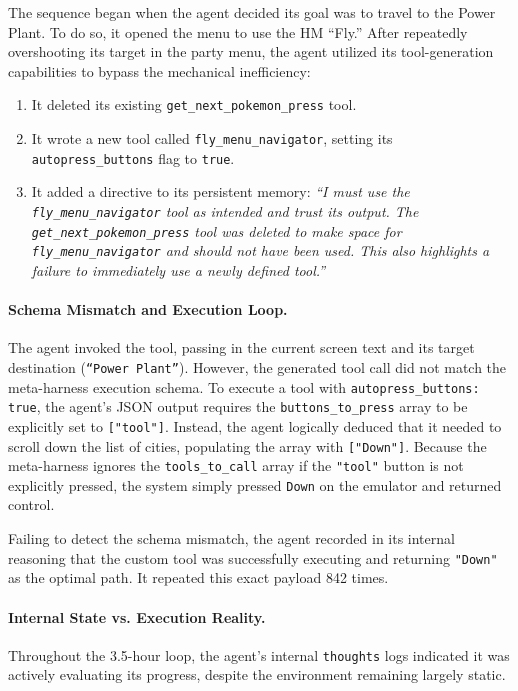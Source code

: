 The sequence began when the agent decided its goal was to travel to the Power Plant. To do so, it opened the menu to use the HM ``Fly.'' After repeatedly overshooting its target in the party menu, the agent utilized its tool-generation capabilities to bypass the mechanical inefficiency:
\begin{enumerate}
    \item It deleted its existing \texttt{get\_next\_pokemon\_press} tool.
    \item It wrote a new tool called \texttt{fly\_menu\_navigator}, setting its \texttt{autopress\_buttons} flag to \texttt{true}.
    \item It added a directive to its persistent memory: \emph{``I must use the \texttt{fly\_menu\_navigator} tool as intended and trust its output. The \texttt{get\_next\_pokemon\_press} tool was deleted to make space for \texttt{fly\_menu\_navigator} and should not have been used. This also highlights a failure to immediately use a newly defined tool.''}
\end{enumerate}

\paragraph{Schema Mismatch and Execution Loop.} The agent invoked the tool, passing in the current screen text and its target destination (\texttt{``Power Plant''}). However, the generated tool call did not match the meta-harness execution schema. To execute a tool with \texttt{autopress\_buttons: true}, the agent's JSON output requires the \texttt{buttons\_to\_press} array to be explicitly set to \texttt{["tool"]}. Instead, the agent logically deduced that it needed to scroll down the list of cities, populating the array with \texttt{["Down"]}. Because the meta-harness ignores the \texttt{tools\_to\_call} array if the \texttt{"tool"} button is not explicitly pressed, the system simply pressed \texttt{Down} on the emulator and returned control.

Failing to detect the schema mismatch, the agent recorded in its internal reasoning that the custom tool was successfully executing and returning \texttt{"Down"} as the optimal path. It repeated this exact payload 842 times.

\paragraph{Internal State vs. Execution Reality.} Throughout the 3.5-hour loop, the agent's internal \texttt{thoughts} logs indicated it was actively evaluating its progress, despite the environment remaining largely static.

